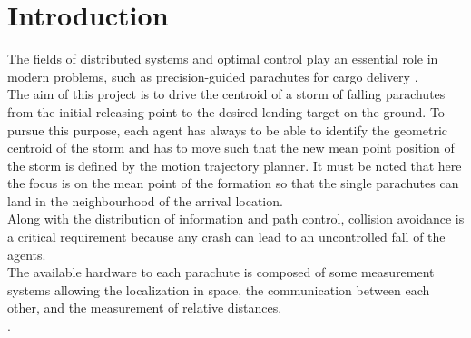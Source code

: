 \section{Introduction}
The fields of distributed systems and optimal control play an essential role in modern problems, such as precision-guided parachutes for cargo delivery \cite{b2} \cite{b3}.\\
The aim of this project is to drive the centroid of a storm of falling parachutes from the initial releasing point to the desired lending target on the ground. To pursue this purpose, each agent has always to be able to identify the geometric centroid of the storm and has to move such that the new mean point position of the storm is defined by the motion trajectory planner. It must be noted that here the focus is on the mean point of the formation so that the single parachutes can land in the neighbourhood of the arrival location.\\
Along with the distribution of information and path control, collision avoidance is a critical requirement because any crash can lead to an uncontrolled fall of the agents.\\
The available hardware to each parachute is composed of some measurement systems allowing the localization in space, the communication between each other, and the measurement of relative distances.\\
.